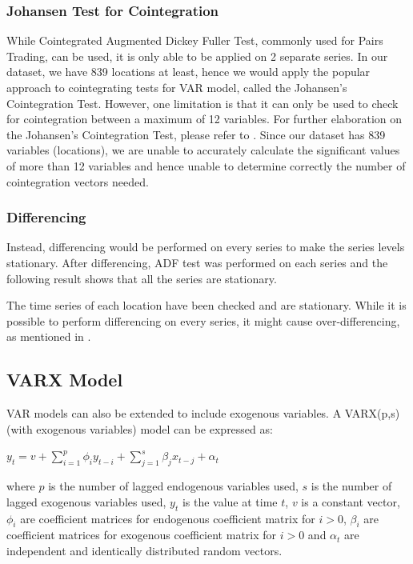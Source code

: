\documentclass[12pt, letterpaper] {article}
\begin{document}
\subsubsection{Johansen Test for Cointegration}
While Cointegrated Augmented Dickey Fuller Test, commonly used for Pairs Trading, can be used, it is only able to be applied on 2 separate series. In our dataset, we have 839 locations at least, hence we would apply the popular approach to cointegrating tests for VAR model, called the Johansen's Cointegration Test. However, one limitation is that it can only be used to check for cointegration between a maximum of 12 variables. For further elaboration on the Johansen's Cointegration Test, please refer to \cite{Johansen1991}. Since our dataset has 839 variables (locations), we are unable to accurately calculate the significant values of more than 12 variables and hence unable to determine correctly the number of cointegration vectors needed. 

\subsubsection{Differencing}
Instead, differencing would be performed on every series to make the series levels stationary. After differencing, ADF test was performed on each series and the following result shows that all the series are stationary. 

\noindent The time series of each location have been checked and are stationary. 
While it is possible to perform differencing on every series, it might cause over-differencing, as mentioned in \cite{Ruey2014}.

\subsection{VARX Model}
VAR models can also be extended to include exogenous variables. A VARX(p,s) (with exogenous variables) model can be expressed as:

\begin{center}
    $\displaystyle y_t=v+\sum_{i=1}^{p} \phi_{i}y_{t-i}+\sum_{j=1}^{s} \beta_{j}x_{t-j}+\alpha_t$
\end{center}

\noindent where $p$ is the number of lagged endogenous variables used, $s$ is the number of lagged exogenous variables used, $y_t$ is the value at time $t$, $v$ is a constant vector, $\phi_i$ are coefficient matrices for endogenous coefficient matrix for $i>0$, $\beta_i$ are coefficient matrices for exogenous coefficient matrix for $i>0$ and $\alpha_t$ are independent and identically distributed random vectors. 
\end{document}
